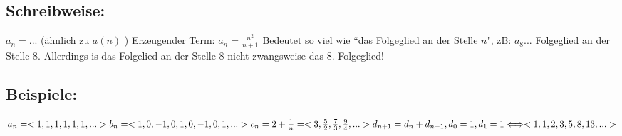 \documentclass[../mainfile.tex]{subfiles}
\begin{document}
\subsection*{Schreibweise:}
$a_n = ...$ (ähnlich zu $a(n)$ )
Erzeugender Term: $a_n = \frac{n^2}{n+1}$
Bedeutet so viel wie ``das Folgeglied an der Stelle $n$", zB: $a_8...$ Folgeglied an der Stelle 8. Allerdings is das Folgelied an der Stelle 8 nicht zwangsweise das 8. Folgeglied!
\subsection*{Beispiele:}
$
a_n = <1, 1, 1, 1, 1, 1, ...>\\
b_n = <1, 0, -1 , 0, 1, 0, -1, 0, 1, ...>\\
c_n = 2+\frac{1}{n}= <3, \frac{5}{2}, \frac{7}{3}, \frac{9}{4}, ...>\\
d_{n+1} = d_n + d_{n-1}, d_0 = 1,  d_1=1  \Longleftrightarrow  <1, 1, 2, 3, 5, 8, 13, ...>
$\\
\end{document}

